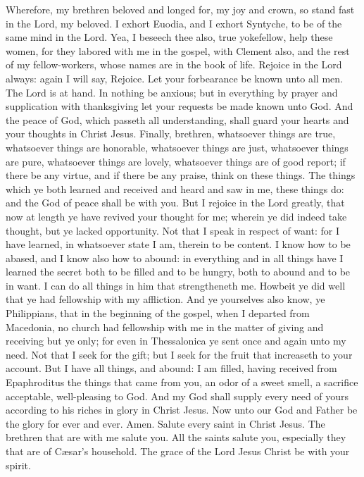 Wherefore, my brethren beloved and longed for, my joy and crown, so stand fast in the Lord, my beloved.  I exhort Euodia, and I exhort Syntyche, to be of the same mind in the Lord. Yea, I beseech thee also, true yokefellow, help these women, for they labored with me in the gospel, with Clement also, and the rest of my fellow-workers, whose names are in the book of life.  Rejoice in the Lord always: again I will say, Rejoice. Let your forbearance be known unto all men. The Lord is at hand. In nothing be anxious; but in everything by prayer and supplication with thanksgiving let your requests be made known unto God. And the peace of God, which passeth all understanding, shall guard your hearts and your thoughts in Christ Jesus.  Finally, brethren, whatsoever things are true, whatsoever things are honorable, whatsoever things are just, whatsoever things are pure, whatsoever things are lovely, whatsoever things are of good report; if there be any virtue, and if there be any praise, think on these things. The things which ye both learned and received and heard and saw in me, these things do: and the God of peace shall be with you.  But I rejoice in the Lord greatly, that now at length ye have revived your thought for me; wherein ye did indeed take thought, but ye lacked opportunity. Not that I speak in respect of want: for I have learned, in whatsoever state I am, therein to be content. I know how to be abased, and I know also how to abound: in everything and in all things have I learned the secret both to be filled and to be hungry, both to abound and to be in want. I can do all things in him that strengtheneth me. Howbeit ye did well that ye had fellowship with my affliction. And ye yourselves also know, ye Philippians, that in the beginning of the gospel, when I departed from Macedonia, no church had fellowship with me in the matter of giving and receiving but ye only; for even in Thessalonica ye sent once and again unto my need. Not that I seek for the gift; but I seek for the fruit that increaseth to your account. But I have all things, and abound: I am filled, having received from Epaphroditus the things that came from you, an odor of a sweet smell, a sacrifice acceptable, well-pleasing to God. And my God shall supply every need of yours according to his riches in glory in Christ Jesus. Now unto our God and Father be the glory for ever and ever. Amen.  Salute every saint in Christ Jesus. The brethren that are with me salute you. All the saints salute you, especially they that are of Cæsar’s household.  The grace of the Lord Jesus Christ be with your spirit. 